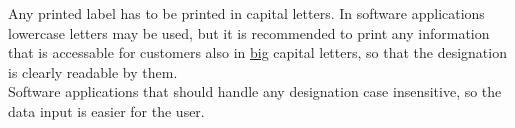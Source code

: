 Any printed label has to be printed in capital letters. In software applications
lowercase letters may be used, but it is recommended to print any information
that is accessable for customers also in \underline{big} capital letters, so
that the designation is clearly readable by them. \\

Software applications that should handle any designation case insensitive, so
the data input is easier for the user.
